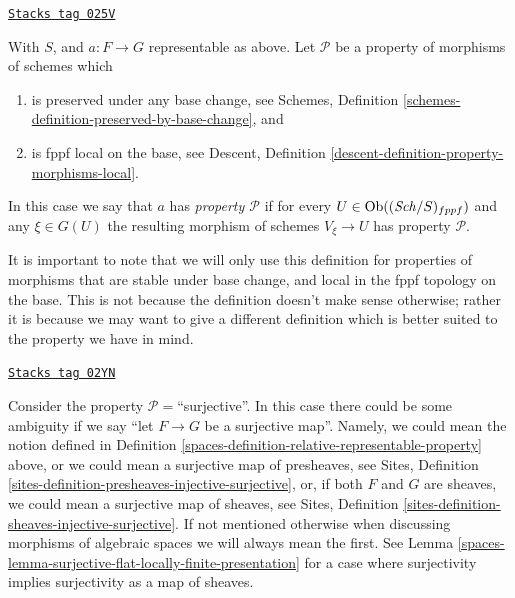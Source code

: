 \begin{definition}
\label{spaces-definition-relative-representable-property}
\href{https://stacks.math.columbia.edu/tag/025V}{\texttt{Stacks tag 025V}}

With $S$, and $a : F \to G$ representable as above.
Let $\mathcal{P}$ be a property of morphisms of schemes which
\begin{enumerate}
\item is preserved under any base change,
see Schemes, Definition \ref{schemes-definition-preserved-by-base-change},
and
\item is fppf local on the base, see
Descent, Definition \ref{descent-definition-property-morphisms-local}.
\end{enumerate}
In this case we say that $a$ has {\it property $\mathcal{P}$} if for every
$U \in \operatorname{Ob}((\mathit{Sch}/S)_{fppf})$ and
any $\xi \in G(U)$ the resulting morphism of schemes
$V_\xi \to U$ has property $\mathcal{P}$.
\end{definition}

It is important to note that we will only use this definition for
properties of morphisms that are stable under base change, and
local in the fppf topology on the base. This is
not because the definition doesn't make sense otherwise; rather it
is because we may want to give a different definition which is
better suited to the property we have in mind.

\begin{remark}[Warning]
\label{spaces-remark-warning}
\href{https://stacks.math.columbia.edu/tag/02YN}{\texttt{Stacks tag 02YN}}

Consider the property $\mathcal{P}=$``surjective''.
In this case there could be some ambiguity if we say
``let $F \to G$ be a surjective map''.
Namely, we could mean the notion defined
in Definition \ref{spaces-definition-relative-representable-property}
above, or we could mean a surjective map of presheaves, see
Sites, Definition \ref{sites-definition-presheaves-injective-surjective},
or, if both $F$ and $G$ are sheaves,
we could mean a surjective map of sheaves, see
Sites, Definition \ref{sites-definition-sheaves-injective-surjective}.
If not mentioned otherwise when discussing morphisms of algebraic spaces
we will always mean the first. See
Lemma \ref{spaces-lemma-surjective-flat-locally-finite-presentation}
for a case where surjectivity implies surjectivity as a map of sheaves.
\end{remark}

